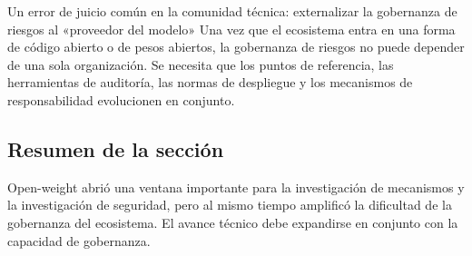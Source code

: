 \begin{warningbox}{Un error de juicio común en la comunidad técnica: externalizar la gobernanza de riesgos al «proveedor del modelo»}
Una vez que el ecosistema entra en una forma de código abierto o de pesos abiertos, la gobernanza de riesgos no puede depender de una sola organización.  
Se necesita que los puntos de referencia, las herramientas de auditoría, las normas de despliegue y los mecanismos de responsabilidad evolucionen en conjunto.
\end{warningbox}

\subsection{Resumen de la sección}
Open-weight abrió una ventana importante para la investigación de mecanismos y la investigación de seguridad, pero al mismo tiempo amplificó la dificultad de la gobernanza del ecosistema. El avance técnico debe expandirse en conjunto con la capacidad de gobernanza.


